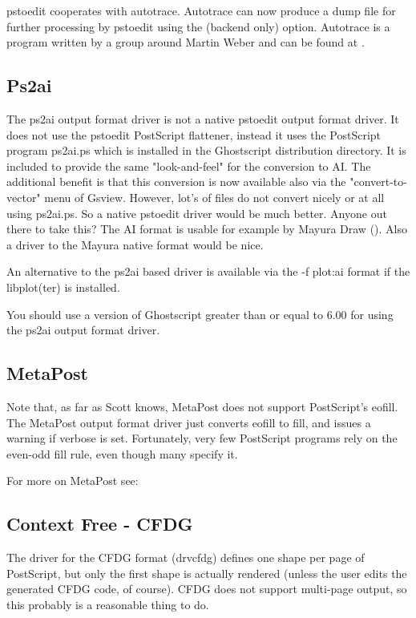 \documentclass[english,a4paper]{article}
\begin{document}
	pstoedit cooperates with autotrace. Autotrace can now produce a dump file
	for further processing by pstoedit using the  (backend only) option.
	Autotrace is a program written by a group around Martin Weber and can be
	found at .

  \subsection{Ps2ai}

    The ps2ai output format driver is not a native pstoedit output format driver. It does not use the
    pstoedit PostScript flattener, instead it uses the PostScript program
    ps2ai.ps which is installed in the Ghostscript distribution directory. It
    is included to provide the same "look-and-feel" for the conversion to AI.
    The additional benefit is that this conversion is now available also via
    the "convert-to-vector" menu of Gsview. However, lot's of files do not
    convert nicely or at all using ps2ai.ps. So a native pstoedit driver would
    be much better. Anyone out there to take this? The AI format is usable for
    example by Mayura Draw (). Also a driver to the
    Mayura native format would be nice.

    An alternative to the ps2ai based driver is available via the -f plot:ai format if the libplot(ter) is installed.

    You should use a version of Ghostscript greater than or equal to 6.00 for using the ps2ai output format driver.


  \subsection{MetaPost}

    Note that, as far as Scott knows, MetaPost does not support PostScript's
    eofill. The MetaPost output format driver just converts eofill to fill, and issues a warning if
    verbose is set. Fortunately, very few PostScript programs rely on the
    even-odd fill rule, even though many specify it.

    For more on MetaPost see:


  \subsection{Context Free - CFDG}
	The driver for the CFDG format (drvcfdg) defines
	one shape per page of PostScript, but only the first shape is actually
	rendered (unless the user edits the generated CFDG code, of course).
	CFDG does not support multi-page output, so this probably is a reasonable thing to do.
\end{document}
